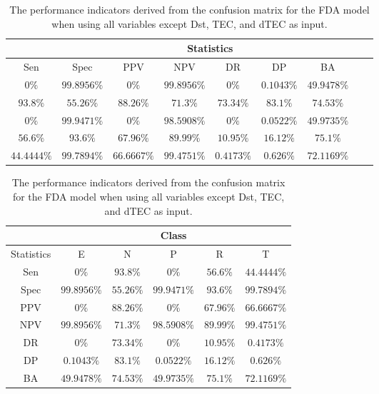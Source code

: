 \begin{table}[!ht]
	\centering
	\begin{tabular}{|c|c|c|c|c|c|c|c|c|}
		\hline
		 & \multicolumn{7}{c|}{Statistics} \\ \hline
		Sen & Spec & PPV & NPV & DR & DP & BA \\ \hline
		$0\%$ & $99.8956\%$ & $0\%$ & $99.8956\%$ & $0\%$ & $0.1043\%$ & $49.9478\%$ \\ \hline
		$93.8\%$ & $55.26\%$ & $88.26\%$ & $71.3\%$ & $73.34\%$ & $83.1\%$ & $74.53\%$ \\ \hline
		$0\%$ & $99.9471\%$ & $0\%$ & $98.5908\%$ & $0\%$ & $0.0522\%$ & $49.9735\%$ \\ \hline
		$56.6\%$ & $93.6\%$ & $67.96\%$ & $89.99\%$ & $10.95\%$ & $16.12\%$ & $75.1\%$ \\ \hline
		$44.4444\%$ & $99.7894\%$ & $66.6667\%$ & $99.4751\%$ & $0.4173\%$ & $0.626\%$ & $72.1169\%$ \\ \hline
	\end{tabular}
	\caption{The performance indicators derived from the confusion matrix for the FDA model when using all variables except Dst, TEC, and dTEC as input.}
	\label{tab:cs:noTEC:fda}
\end{table}

\begin{table}[!ht]
	\centering
	\begin{tabular}{|c|c|c|c|c|c|}
		\hline
		 & \multicolumn{5}{c|}{Class} \\ \hline
		Statistics & E & N & P & R & T \\ \hline
		Sen & $0\%$ & $93.8\%$ & $0\%$ & $56.6\%$ & $44.4444\%$ \\ \hline
		Spec & $99.8956\%$ & $55.26\%$ & $99.9471\%$ & $93.6\%$ & $99.7894\%$ \\ \hline
		PPV & $0\%$ & $88.26\%$ & $0\%$ & $67.96\%$ & $66.6667\%$ \\ \hline
		NPV & $99.8956\%$ & $71.3\%$ & $98.5908\%$ & $89.99\%$ & $99.4751\%$ \\ \hline
		DR & $0\%$ & $73.34\%$ & $0\%$ & $10.95\%$ & $0.4173\%$ \\ \hline
		DP & $0.1043\%$ & $83.1\%$ & $0.0522\%$ & $16.12\%$ & $0.626\%$ \\ \hline
		BA & $49.9478\%$ & $74.53\%$ & $49.9735\%$ & $75.1\%$ & $72.1169\%$ \\ \hline
	\end{tabular}
	\caption{The performance indicators derived from the confusion matrix for the FDA model when using all variables except Dst, TEC, and dTEC as input.}
	\label{tab:cs:reverse:noTEC:fda}
\end{table}

